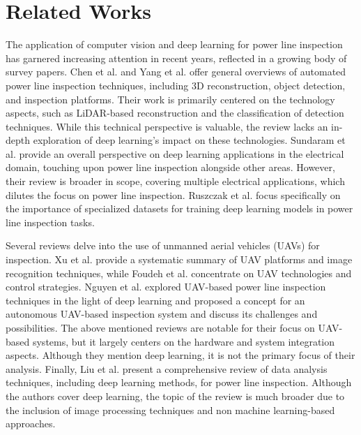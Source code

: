 \section{Related Works}
\label{sec:related_works}
The application of computer vision and deep learning for power line inspection has garnered increasing attention in recent years, reflected in a growing body of survey papers. Chen et al. \cite{chen2021environment} and Yang et al. \cite{yang2020review} offer general overviews of automated power line inspection techniques, including 3D reconstruction, object detection, and inspection platforms. Their work is primarily centered on the technology aspects, such as LiDAR-based reconstruction and the classification of detection techniques. While this technical perspective is valuable, the review lacks an in-depth exploration of deep learning's impact on these technologies. Sundaram et al. \cite{sundaram2021deep} provide an overall perspective on deep learning applications in the electrical domain, touching upon power line inspection alongside other areas. However, their review is broader in scope, covering multiple electrical applications, which dilutes the focus on power line inspection. Ruszczak et al. \cite{ruszczak2023overview} focus specifically on the importance of specialized datasets for training deep learning models in power line inspection tasks. 

Several reviews delve into the use of unmanned aerial vehicles (UAVs) for inspection. Xu et al. \cite{xu2023development} provide a systematic summary of UAV platforms and image recognition techniques, while Foudeh et al. \cite{foudeh2021advanced} concentrate on UAV technologies and control strategies. Nguyen et al. \cite{nguyen_intelligent_2019, nguyen_automatic_2018} explored UAV-based power line inspection techniques in the light of deep learning and proposed a concept for an autonomous UAV-based inspection system and discuss its challenges and possibilities. The above mentioned reviews are notable for their focus on UAV-based systems, but it largely centers on the hardware and system integration aspects. Although they mention deep learning, it is not the primary focus of their analysis. Finally, Liu et al. \cite{liu_data_2020} present a comprehensive review of data analysis techniques, including deep learning methods, for power line inspection. Although the authors cover deep learning, the topic of the review is much broader due to the inclusion of image processing techniques and non machine learning-based approaches.

